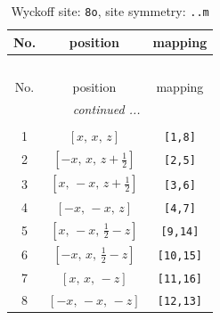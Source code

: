 \documentclass[fleqn,8pt]{jsarticle}
\begin{document}
\begin{longtable}{ccc}
\caption{Wyckoff site: {\tt 8o}, site symmetry: {\tt ..m}}
 \\
 \hline \hline
No. & position & mapping \\ \hline \endfirsthead

\multicolumn{2}{l}{\tablename\ \thetable{}} \\
 \hline \hline
No. & position & mapping \\ \hline \endhead

 \hline \hline
\multicolumn{2}{r}{\footnotesize\it continued ...} \\ \endfoot

 \hline \hline
\multicolumn{2}{r}{} \\ \endlastfoot

1 & $\left[ x,\, x,\, z \right]$ & {\tt [1,8]} \\ \hline
2 & $\left[ - x,\, x,\, z + \frac{1}{2} \right]$ & {\tt [2,5]} \\ \hline
3 & $\left[ x,\, - x,\, z + \frac{1}{2} \right]$ & {\tt [3,6]} \\ \hline
4 & $\left[ - x,\, - x,\, z \right]$ & {\tt [4,7]} \\ \hline
5 & $\left[ x,\, - x,\, \frac{1}{2} - z \right]$ & {\tt [9,14]} \\ \hline
6 & $\left[ - x,\, x,\, \frac{1}{2} - z \right]$ & {\tt [10,15]} \\ \hline
7 & $\left[ x,\, x,\, - z \right]$ & {\tt [11,16]} \\ \hline
8 & $\left[ - x,\, - x,\, - z \right]$ & {\tt [12,13]} \\
\end{longtable}
\renewcommand{\arraystretch}{1.2}
\end{document}
